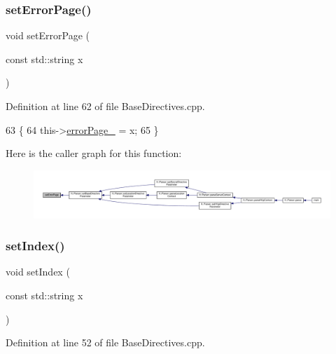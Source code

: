 \subsubsection{\texorpdfstring{set\+Error\+Page()}{setErrorPage()}}
{\footnotesize\ttfamily void set\+Error\+Page (\begin{DoxyParamCaption}\item[{const std\+::string}]{x }\end{DoxyParamCaption})\hspace{0.3cm}{\ttfamily [inherited]}}



Definition at line 62 of file Base\+Directives.\+cpp.


\begin{DoxyCode}
63     \{
64         this->\hyperlink{classft_1_1_base_directives_a5c0d388109f086503961de84fe3fce90}{errorPage\_} = x;
65     \}
\end{DoxyCode}
Here is the caller graph for this function\+:
\nopagebreak
\begin{figure}[H]
\begin{center}
\leavevmode
\includegraphics[width=350pt]{classft_1_1_base_directives_a505ecc88b3e1779583ad60cc243c7769_icgraph}
\end{center}
\end{figure}
\mbox{\label{classft_1_1_base_directives_a6d3d8fd6eaaf71304128af6b3cee2a69}} 
\subsubsection{\texorpdfstring{set\+Index()}{setIndex()}}
{\footnotesize\ttfamily void set\+Index (\begin{DoxyParamCaption}\item[{const std\+::string}]{x }\end{DoxyParamCaption})\hspace{0.3cm}{\ttfamily [inherited]}}



Definition at line 52 of file Base\+Directives.\+cpp.



